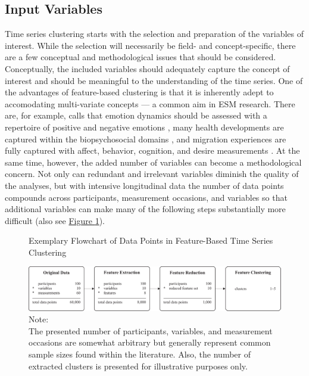 \documentclass[man, 12pt, a4paper, mask, floatsintext]{apa7}
\theoremstyle{break}
\theoremstyle{plain}
\newcommand{\fgrref}[2][]{\hyperref[#2]{Figure \ref*{#2}#1}}
\begin{document}
\subsection{Input Variables}
Time series clustering starts with the selection and preparation of the variables of interest. While the selection will necessarily be field- and concept-specific, there are a few conceptual and methodological issues that should be considered. Conceptually, the included variables should adequately capture the concept of interest and should be meaningful to the understanding of the time series. One of the advantages of feature-based clustering is that it is inherently adept to accomodating multi-variate concepts --- a common aim in ESM research. There are, for example, calls that emotion dynamics should be assessed with a repertoire of positive and negative emotions \citep[e.g.,][]{dejonckheere2019}, many health developments are captured within the biopsychosocial domains \citep[e.g.,][]{suls2004}, and migration experiences are fully captured with affect, behavior, cognition, and desire measurements \citep[e.g.,][]{Kreienkamp2022d}. At the same time, however, the added number of variables can become a methodological concern. Not only can redundant and irrelevant variables diminish the quality of the analyses, but with intensive longitudinal data the number of data points compounds across participants, measurement occasions, and variables so that additional variables can make many of the following steps substantially more difficult (also see \fgrref{fig:TSCFlowN}). 

\begin{figure}[!ht] %
  \caption{Exemplary Flowchart of Data Points in Feature-Based Time Series Clustering}
  \label{fig:TSCFlowN}
  \centering\includegraphics[width=\textwidth]{figures/TS Cluster Flow/tsClustFlowN.pdf}
  \caption*{Note: \\
  The presented number of participants, variables, and measurement occasions are somewhat arbitrary but generally represent common sample sizes found within the literature. Also, the number of extracted clusters is presented for illustrative purposes only.}
\end{figure}


\end{document}
